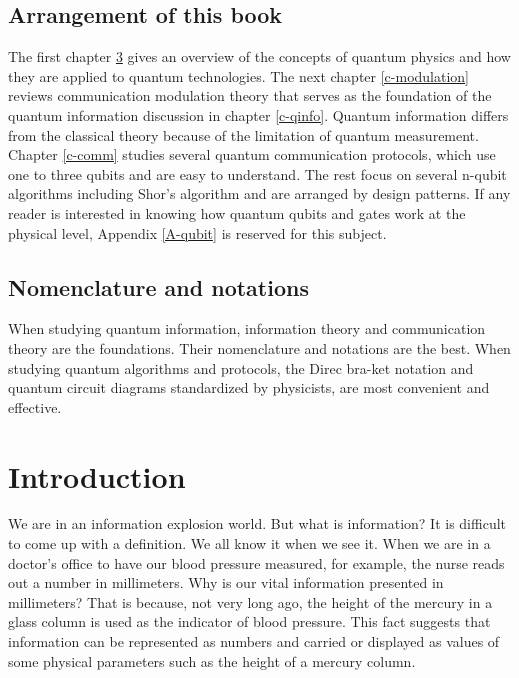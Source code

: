 \documentclass[oneside, letter, 12pt]{book}
\begin{document}
\section{Arrangement of this book}
The first chapter \ref{c-intro} gives an overview of the concepts of quantum physics and how they are applied to quantum technologies. The next chapter \ref{c-modulation} reviews communication modulation theory that serves as the foundation of the quantum information discussion in chapter \ref{c-qinfo}. Quantum information differs from the classical theory because of the limitation of quantum measurement. Chapter \ref{c-comm} studies several quantum communication protocols, which use one to three qubits and are easy to understand. The rest focus on several n-qubit algorithms including Shor's algorithm and are arranged by design patterns. If any reader is interested in knowing how quantum qubits and gates work at the physical level, Appendix \ref{A-qubit} is reserved for this subject.

\section{Nomenclature and notations}
When studying quantum information, information theory and communication theory are the foundations. Their nomenclature and notations are the best. When studying quantum algorithms and protocols, the Direc bra-ket notation and quantum circuit diagrams standardized by physicists, are most convenient and effective.

\setcounter{tocdepth}{3}
\tableofcontents

\mainmatter

\chapter{Introduction}\label{c-intro}
We are in an information explosion world. But what is information? It is difficult to come up with a definition. We all know it when we see it. When we are in a doctor's office to have our blood pressure measured, for example, the nurse reads out a number in millimeters. Why is our vital information presented in millimeters? That is because, not very long ago, the height of the mercury in a glass column is used as the indicator of blood pressure. This fact suggests that information can be represented as numbers and carried or displayed as values of some physical parameters such as the height of a mercury column.
\end{document}
